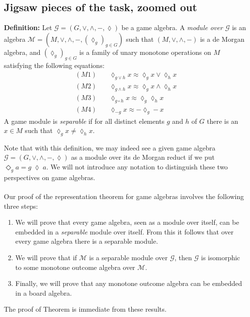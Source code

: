 \documentclass[12pt]{article}
\begin{document}
\subsection{Jigsaw pieces of the task, zoomed out}
\textbf{Definition:}
Let $\mathcal{G} = (G,\vee,\wedge,-,\lozenge)$ be a game algebra. A 
\emph{module over $\mathcal{G}$} is an algebra 
$\mathcal{M} = (M,\vee,\wedge,-,(\lozenge_g)_{g\in G})$ 
such that $(M,\vee,\wedge,-)$ is a de Morgan algebra, and 
$(\lozenge_g)_{g\in G}$ is a family of unary monotone operations on $M$ 
satisfying the following equations:
\begin{align*}
(M1) \quad & \lozenge_{g\vee h}x \approx \lozenge_g x \vee \lozenge_h x \\
(M2) \quad & \lozenge_{g\wedge h}x \approx \lozenge_g x \wedge \lozenge_h x \\
(M3) \quad & \lozenge_{g\circ h}x \approx \lozenge_g \lozenge_h x \\
(M4) \quad & \lozenge_{-g}x \approx - \lozenge_g -x
\end{align*}
A game module is \emph{separable} if for all distinct elements $g$ and $h$ of $G$ 
there is an $x \in M$ such that $\lozenge_g x \neq \lozenge_h x$. 


\noindent
Note that with this definition, we may indeed see a given game algebra 
$\mathcal{G} = (G,\vee,\wedge,-,\lozenge)$ as a module over its de Morgan 
reduct if we put $\Diamond_g a = g \; \lozenge \; a$. We will not introduce any 
notation to distinguish these two perspectives on game algebras. \\ \\
Our proof of the representation theorem for game algebras involves the 
following three steps:

\begin{enumerate}
    \item We will prove that every game algebra, seen as a 
    module over itself, can be embedded in a \emph{separable} module over itself. 
    From this it follows that over every game algebra there is a separable module.
    \item We will prove that if $\mathcal{M}$ is a separable module over 
    $\mathcal{G}$, then $\mathcal{G}$ is isomorphic to some monotone outcome 
    algebra over $\mathcal{M}$.
    \item Finally, we will prove that any monotone outcome algebra can be 
    embedded in a board algebra.
\end{enumerate}
The proof of Theorem is immediate from these results.
\end{document}
